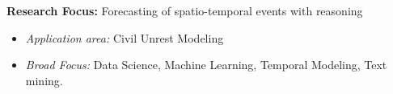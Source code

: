 
\vspace{1em}
\textbf{Research Focus: } Forecasting of spatio-temporal events with reasoning
\begin{itemize}[nosep]
    \item \textit{Application area:} Civil Unrest Modeling
  \item \textit{Broad Focus:} Data Science, Machine Learning, Temporal Modeling, Text mining.
\end{itemize}

